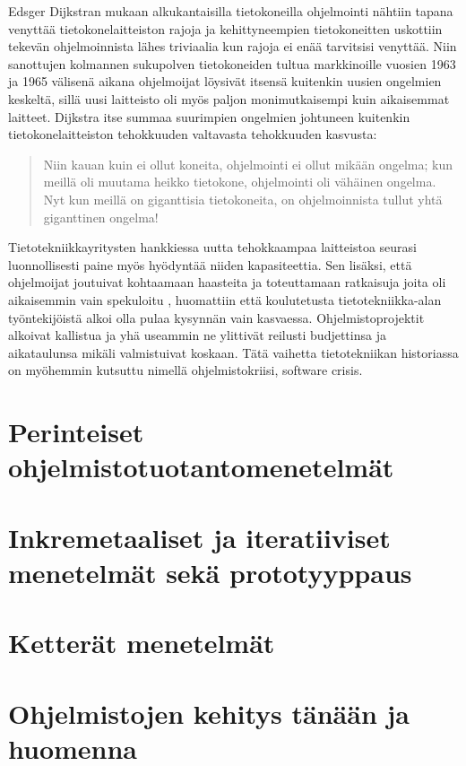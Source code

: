 \documentclass[finnish,12pt]{tktltiki2}
\theoremstyle{definition}
\theoremstyle{remark}
\begin{document}
Edsger Dijkstran mukaan alkukantaisilla tietokoneilla ohjelmointi nähtiin tapana venyttää tietokonelaitteiston rajoja ja kehittyneempien tietokoneitten uskottiin tekevän ohjelmoinnista lähes triviaalia kun rajoja ei enää tarvitsisi venyttää. \cite{Dijkstra:1979:HP:1241515.1241525} Niin sanottujen kolmannen sukupolven tietokoneiden tultua markkinoille vuosien 1963 ja 1965 välisenä aikana ohjelmoijat löysivät itsensä kuitenkin uusien ongelmien keskeltä, sillä uusi laitteisto oli myös paljon monimutkaisempi kuin aikaisemmat laitteet. Dijkstra itse summaa suurimpien ongelmien johtuneen kuitenkin tietokonelaitteiston tehokkuuden valtavasta tehokkuuden kasvusta: \begin{quote}
Niin kauan kuin ei ollut koneita, ohjelmointi ei ollut mikään ongelma; kun meillä oli muutama heikko tietokone, ohjelmointi oli vähäinen ongelma. Nyt kun meillä on giganttisia tietokoneita, on ohjelmoinnista tullut yhtä giganttinen ongelma! \cite{Dijkstra:1979:HP:1241515.1241525}
\end{quote} Tietotekniikkayritysten hankkiessa uutta tehokkaampaa laitteistoa seurasi luonnollisesti paine myös hyödyntää niiden kapasiteettia. Sen lisäksi, että ohjelmoijat joutuivat kohtaamaan haasteita ja toteuttamaan ratkaisuja joita oli aikaisemmin vain spekuloitu \cite{Dijkstra:1979:HP:1241515.1241525}, huomattiin että koulutetusta tietotekniikka-alan työntekijöistä alkoi olla pulaa kysynnän vain kasvaessa. \cite{DBLP:reference/se/Grier10} Ohjelmistoprojektit alkoivat kallistua ja yhä useammin ne ylittivät reilusti budjettinsa ja aikataulunsa mikäli valmistuivat koskaan.\cite{CHAOS1994} Tätä vaihetta tietotekniikan historiassa on myöhemmin kutsuttu nimellä ohjelmistokriisi, software crisis.



\section{Perinteiset ohjelmistotuotantomenetelmät}
\section{Inkremetaaliset ja iteratiiviset menetelmät sekä prototyyppaus}
\section{Ketterät menetelmät}
\section{Ohjelmistojen kehitys tänään ja huomenna}
\end{document}
